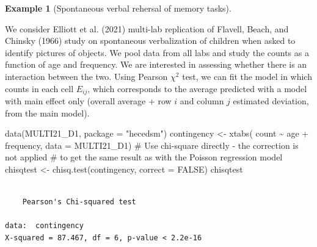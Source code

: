 \documentclass[
  11pt,
  letterpaper,
]{scrbook}
\newenvironment{Shaded}{\begin{snugshade}}{\end{snugshade}}
\newcommand{\AttributeTok}[1]{\textcolor[rgb]{0.40,0.45,0.13}{#1}}
\newcommand{\CommentTok}[1]{\textcolor[rgb]{0.37,0.37,0.37}{#1}}
\newcommand{\ConstantTok}[1]{\textcolor[rgb]{0.56,0.35,0.01}{#1}}
\newcommand{\FunctionTok}[1]{\textcolor[rgb]{0.28,0.35,0.67}{#1}}
\newcommand{\NormalTok}[1]{\textcolor[rgb]{0.00,0.23,0.31}{#1}}
\newcommand{\OtherTok}[1]{\textcolor[rgb]{0.00,0.23,0.31}{#1}}
\newcommand{\SpecialCharTok}[1]{\textcolor[rgb]{0.37,0.37,0.37}{#1}}
\newcommand{\StringTok}[1]{\textcolor[rgb]{0.13,0.47,0.30}{#1}}
\theoremstyle{definition}
\theoremstyle{definition}
\newtheorem{example}{Example}[chapter]
\theoremstyle{remark}
\begin{document}
\begin{example}[Spontaneous verbal rehersal of memory
tasks]\protect\hypertarget{exm-elliot-contingency}{}\label{exm-elliot-contingency}

We consider Elliott et al. (2021) multi-lab replication of Flavell,
Beach, and Chinsky (1966) study on spontaneous verbalization of children
when asked to identify pictures of objects. We pool data from all labs
and study the counts as a function of age and frequency. We are
interested in assessing whether there is an interaction between the two.
Using Pearson \(\chi^2\) test, we can fit the model in which counts in
each cell \(E_{ij}\), which corresponds to the average predicted with a
model with main effect only (overall average + row \(i\) and column
\(j\) estimated deviation, from the main model).

\begin{Shaded}
\begin{Highlighting}[]
\FunctionTok{data}\NormalTok{(MULTI21\_D1, }\AttributeTok{package =} \StringTok{"hecedsm"}\NormalTok{)}
\NormalTok{contingency }\OtherTok{\textless{}{-}} \FunctionTok{xtabs}\NormalTok{(}
\NormalTok{  count }\SpecialCharTok{\textasciitilde{}}\NormalTok{ age }\SpecialCharTok{+}\NormalTok{ frequency, }
  \AttributeTok{data =}\NormalTok{ MULTI21\_D1)}
\CommentTok{\# Use chi{-}square directly {-} the correction is not applied}
\CommentTok{\# to get the same result as with the Poisson regression model}
\NormalTok{chisqtest }\OtherTok{\textless{}{-}} \FunctionTok{chisq.test}\NormalTok{(contingency, }\AttributeTok{correct =} \ConstantTok{FALSE}\NormalTok{)}
\NormalTok{chisqtest}
\end{Highlighting}
\end{Shaded}

\begin{verbatim}

    Pearson's Chi-squared test

data:  contingency
X-squared = 87.467, df = 6, p-value < 2.2e-16
\end{verbatim}

\begin{Shaded}
\end{Shaded}


\end{example}
\end{document}
